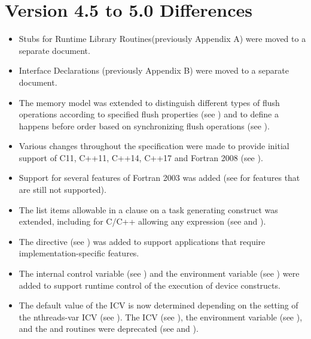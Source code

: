 \section{Version 4.5 to 5.0 Differences}
\label{sec:Version 4.5 to 5.0 Differences}
\begin{itemize}
\item Stubs for Runtime Library Routines(previously Appendix A) were moved to a separate document.
\item Interface Declarations (previously Appendix B) were moved to a separate document.

\item The memory model was extended to distinguish different types of flush
      operations according to specified flush properties (see
      ) and to define a happens
      before order based on synchronizing flush operations
      (see ).

\item Various changes throughout the specification were made to provide
      initial support of C11, C++11, C++14, C++17 and Fortran 2008 (see
      ).

\item Support for several features of Fortran 2003 was added (see
       for features that are still
      not supported).

\item The list items allowable in a  clause on a task generating
      construct was extended, including for C/C++ allowing any 
      expression (see  and
      ).

\item The  directive (see ) was
      added to support applications that require implementation-specific
      features.

\item The  internal control variable (see
      ) and the
       environment variable (see
      ) were added to support runtime
      control of the execution of device constructs.

\item The default value of the  ICV is now determined depending on
      the setting of the nthreads-var ICV (see ).
      The  ICV (see ), the
       environment variable (see ),
      and the  and  routines
      were deprecated (see  and
      ).


\end{itemize}
